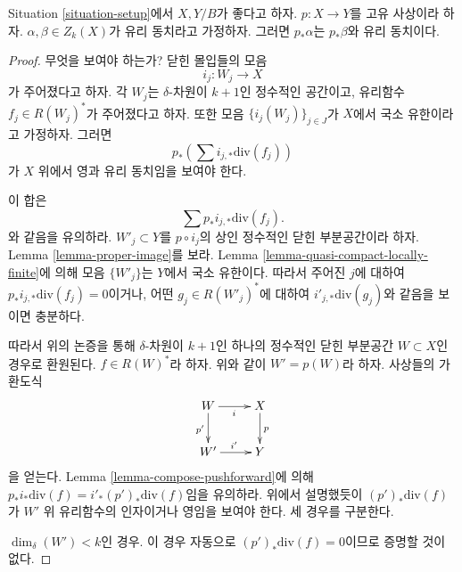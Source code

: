 \begin{lemma}
\label{lemma-proper-pushforward-rational-equivalence}
Situation \ref{situation-setup}에서 $X, Y/B$가 좋다고 하자.
$p : X \to Y$를 고유 사상이라 하자.
$\alpha, \beta \in Z_k(X)$가 유리 동치라고 가정하자.
그러면 $p_*\alpha$는 $p_*\beta$와 유리 동치이다.
\end{lemma}

\begin{proof}
무엇을 보여야 하는가? 닫힌 몰입들의 모음
$$
i_j : W_j \longrightarrow X
$$
가 주어졌다고 하자. 각 $W_j$는 $\delta$-차원이 $k + 1$인
정수적인 공간이고, 유리함수 $f_j \in R(W_j)^*$가 주어졌다고 하자.
또한 모음 $\{i_j(W_j)\}_{j \in J}$가 $X$에서 국소 유한이라고
가정하자. 그러면
$$
p_*\left(\sum i_{j, *}\text{div}(f_j)\right)
$$
가 $X$ 위에서 영과 유리 동치임을 보여야 한다.

\medskip\noindent
이 합은
$$
\sum p_*i_{j, *}\text{div}(f_j).
$$
와 같음을 유의하라. $W'_j \subset Y$를 $p \circ i_j$의 상인
정수적인 닫힌 부분공간이라 하자. Lemma \ref{lemma-proper-image}를
보라. Lemma \ref{lemma-quasi-compact-locally-finite}에 의해
모음 $\{W'_j\}$는 $Y$에서 국소 유한이다. 따라서 주어진 $j$에
대하여 $p_*i_{j, *}\text{div}(f_j) = 0$이거나, 어떤
$g_j \in R(W'_j)^*$에 대하여
$i'_{j, *}\text{div}(g_j)$와 같음을 보이면 충분하다.

\medskip\noindent
따라서 위의 논증을 통해 $\delta$-차원이 $k + 1$인 하나의 정수적인
닫힌 부분공간 $W \subset X$인 경우로 환원된다.
$f \in R(W)^*$라 하자. 위와 같이 $W' = p(W)$라 하자.
사상들의 가환도식
$$
\xymatrix{
W \ar[r]_i \ar[d]_{p'} & X \ar[d]^p \\
W' \ar[r]^{i'} & Y
}
$$
을 얻는다. Lemma \ref{lemma-compose-pushforward}에 의해
$p_*i_*\text{div}(f) = i'_*(p')_*\text{div}(f)$임을 유의하라.
위에서 설명했듯이 $(p')_*\text{div}(f)$가 $W'$ 위 유리함수의
인자이거나 영임을 보여야 한다. 세 경우를 구분한다.

\medskip\noindent
$\dim_\delta(W') < k$인 경우. 이 경우 자동으로
$(p')_*\text{div}(f) = 0$이므로 증명할 것이 없다.


\end{proof}
